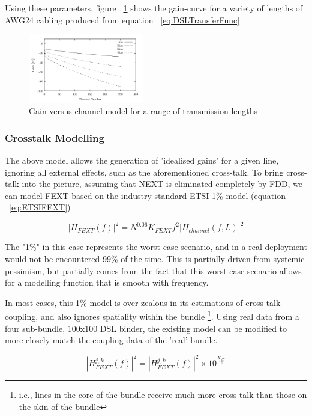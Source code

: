Using these parameters, figure ~\ref{fig:XTG_Example} shows the gain-curve for a variety of lengths of AWG24 cabling produced from equation ~\eqref{eq:DSLTransferFunc}

\begin{figure}[!h]
  \centering
  \includegraphics[width=0.45\textwidth]{images/awg24lengths.png}
  \caption{Gain versus channel model for a range of transmission lengths}
  \label{fig:XTG_Example}
\end{figure}

\subsubsection{Crosstalk Modelling}
\label{sec:XTmodel}

The above model allows the generation of 'idealised gains' for a given line, ignoring all external effects, such as the aforementioned cross-talk. To bring cross-talk into the picture, assuming that NEXT is eliminated completely by FDD, we can model FEXT based on the industry standard ETSI 1\% \cite{ETSI03} model (equation ~\eqref{eq:ETSIFEXT})

\begin{equation}\label{eq:ETSIFEXT}
|H_{FEXT}(f)|^2=N^{0.06}K_{FEXT}f^2 |H_{channel}(f,L)|^2
\end{equation}

The "1\%" in this case represents the worst-case-scenario, and in a real deployment would not be encountered 99\% of the time. This is partially driven from systemic pessimism, but partially comes from the fact that this worst-case scenario allows for a modelling function that is smooth with frequency.

In most cases, this 1\% model is over zealous in its estimations of cross-talk coupling, and also ignores spatiality within the bundle \footnote{i.e., lines in the core of the bundle receive much more cross-talk than those on the skin of the bundle}. Using real data from a four sub-bundle, 100x100 DSL binder, the existing model can be modified to more closely match the coupling data of the 'real' bundle.

\begin{equation}\label{eq:ATTFEXT}
|H^{j,k}_{FEXT}(f)|^2=|H^{j,k}_{FEXT}(f)|^2 \times 10^{\frac{X_{dB}}{10}}
\end{equation}

